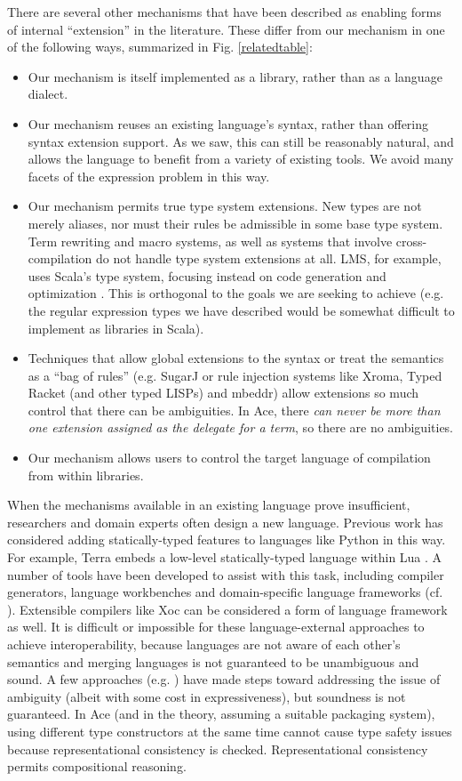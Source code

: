 \documentclass[10pt,preprint]{sigplanconf}
\begin{document}
{There are several other mechanisms that have been described as enabling forms of internal ``extension'' in the literature. These differ from our mechanism in one of the following ways, summarized in Fig. \ref{relatedtable}:
\begin{itemize}
\item Our mechanism is itself implemented as a library, rather than as a language dialect.
\item Our mechanism reuses an existing language's syntax, rather than offering syntax extension support. As we saw, this can still be reasonably natural, and allows the language to benefit from a variety of existing tools. We avoid many facets of the expression problem \cite{wadler1998expression} in this way.
\item Our mechanism permits true type system extensions. New types are not merely aliases, nor must their rules be admissible in some base type system. Term rewriting and macro systems, as well as systems that involve cross-compilation do not handle type system extensions at all. LMS, for example, uses Scala's type system, focusing instead on code generation and optimization \cite{Rompf:2012:LMS}. This is orthogonal to the goals we are seeking to achieve (e.g. the regular expression types we have described would be somewhat difficult to implement as libraries in Scala).
\item Techniques that allow global extensions to the syntax or treat the semantics as a ``bag of rules'' (e.g. SugarJ or rule injection systems like Xroma, Typed Racket (and other typed LISPs) and mbeddr) allow extensions so much control that there can be ambiguities. In Ace, there \emph{can never be more than one extension assigned as the delegate for a term}, so there are no ambiguities. 
\item Our mechanism allows users to control the target language of compilation from within libraries.
\end{itemize}

When the mechanisms available in an existing language prove insufficient, researchers and domain experts often design a new language. Previous work has considered adding statically-typed features to languages like Python in this way. For example, Terra embeds a low-level statically-typed language within Lua \cite{terra}. A number of tools have been developed to assist with this task, including compiler generators, language workbenches and domain-specific language frameworks (cf. \cite{erdweg2013state}). 
Extensible compilers like Xoc \cite{conf/asplos/CoxBCKK08} can be considered a form of language framework as well. It is difficult or impossible for these language-external approaches to achieve interoperability, because languages are not aware of each other's semantics and merging languages is not guaranteed to be unambiguous and sound. A few approaches (e.g. ) have made steps toward addressing the issue of ambiguity (albeit with some cost in expressiveness), but soundness is not guaranteed. In Ace (and in the theory, assuming a suitable packaging system), using different type constructors at the same time cannot cause type safety issues because representational consistency is checked. Representational consistency permits compositional reasoning.

}
\end{document}
